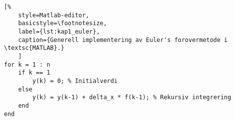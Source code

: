 \documentclass[../main.tex]{subfiles}
\begin{document}
\begin{minipage}[htb]{\textwidth}

    \begin{lstlisting}[%
    style=Matlab-editor,
    basicstyle=\footnotesize,
    label={lst:kap1_euler},
    caption={Generell implementering av Euler's forovermetode i \textsc{MATLAB}.}
    ]
for k = 1 : n
    if k == 1
        y(k) = 0; % Initialverdi
    else
        y(k) = y(k-1) + delta_x * f(k-1); % Rekursiv integrering
    end
end
\end{lstlisting}

\end{minipage}
\end{document}
